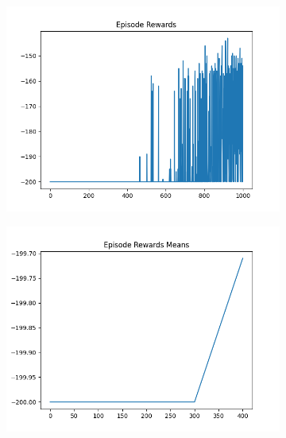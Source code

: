 \begin{figure}[H]
    \centering
    \begin{subfigure}{.47\linewidth}
        \centering
        \includegraphics[width=\textwidth]{mountain/2024-06-15_11-21-25_dqn_mountaincar_episode_rewards.png}
    \end{subfigure}
    \begin{subfigure}{.47\linewidth}
        \centering
        \includegraphics[width=\textwidth]{mountain/2024-06-15_12-31-16_dqn_mountaincar_episode_rewards_means.png}
    \end{subfigure}
    \begin{subfigure}{.47\linewidth}
        \centering

\end{subfigure}
\end{figure}
